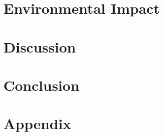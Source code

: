 \documentclass[headsepline,footsepline,footinclude=True,oneside,draft,fontsize=11pt,paper=a4,listof=totoc,bibliography=totoc]{scrbook} %
\begin{document}
\chapter{Environmental Impact}
\label{chapter:06_enviromental_impact}


\chapter{Discussion}
\label{chapter:07_discussion}


\chapter{Conclusion}
\label{chapter:08_conclusion}


\appendix
\chapter{Appendix}


\appendix{}

\printbibliography{}
\end{document}
